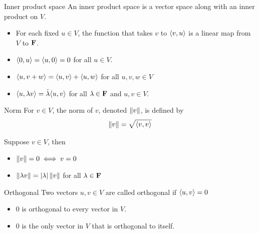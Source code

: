 \documentclass[12pt,a4paper]{article}
\begin{document}
    \begin{defi}{Inner product space}
        An inner product space is a vector space along with an inner product on $V$.
    \end{defi}
    \hfill

    \begin{prop}
        \hfill
    
        \begin{itemize}
            \item For each fixed $u\in V$, the function that takes $v$ to $\langle v,u\rangle$ is a linear map from $V$ to $\mathbf{F}$.
            \item $\langle0,u\rangle=\langle u,0\rangle=0$ for all $u\in V$.
            \item $\langle u,v+w\rangle=\langle u,v\rangle+\langle u,w\rangle$ for all $u,v,w\in V$
            \item $\langle u,\lambda v\rangle=\Bar{\lambda}\langle u,v\rangle$ for all $\lambda\in\mathbf{F}$ and $u,v\in V$.
        \end{itemize}
    \end{prop}
    \hfill
    
    \begin{defi}{Norm}%
        For $v\in V$, the norm of $v$, denoted $\left\lVert v\right\rVert$, is defined by
        $$
        \left\lVert v\right\rVert=\sqrt{\langle v,v\rangle}
        $$
    \end{defi}
    \hfill

    \begin{prop}
        Suppose $v\in V$, then
        \begin{itemize}
            \item $\left\lVert v\right\rVert=0\iff v=0$
            \item $\left\lVert \lambda v\right\rVert=\left\lvert \lambda\right\rvert\left\lVert v\right\rVert$ for all $\lambda\in\mathbf{F}$
        \end{itemize}
    \end{prop}
    \hfill

    \begin{defi}{Orthogonal}
        Two vectors $u,v\in V$ are called orthogonal if $\langle u,v\rangle=0$
    \end{defi}
    \hfill
    
    \begin{prop}
        \hfill

        \begin{itemize}
            \item $0$ is orthogonal to every vector in $V$.
            \item $0$ is the only vector in $V$ that is orthogonal to itself.
        \end{itemize}
    \end{prop}
    \hfill
\end{document}
